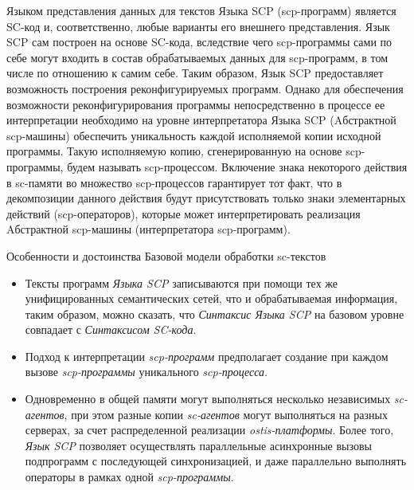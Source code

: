\begin{frame}{}
\vspace{30pt}
Языком представления данных для текстов Языка SCP (scp-программ) является SC-код и, соответственно, любые варианты его внешнего представления. Язык SCP сам построен на основе SC-кода, вследствие чего scp-программы сами по себе могут входить в состав обрабатываемых данных для scp-программ, в том числе по отношению к самим себе. Таким образом, Язык SCP предоставляет возможность построения реконфигурируемых программ. Однако для обеспечения возможности реконфигурирования программы непосредственно в процессе ее интерпретации необходимо на уровне интерпретатора Языка SCP (Aбстрактной scp-машины) обеспечить уникальность каждой исполняемой копии исходной программы. Такую исполняемую копию, сгенерированную на основе scp-программы, будем называть scp-процессом. Включение знака некоторого действия в sc-памяти во множество scp-процессов гарантирует тот факт, что в декомпозиции данного действия будут присутствовать только знаки элементарных действий (scp-операторов), которые может интерпретировать реализация Aбстрактной scp-машины (интерпретатора scp-программ).
\end{frame}

\begin{frame}{Особенности и достоинства Базовой модели обработки sc-текстов}
\topline
\vspace{30pt}
 \\

\begin{itemize}
    \item Тексты программ \textit{Языка SCP} записываются при помощи тех же унифицированных семантических сетей, что и обрабатываемая информация, таким образом, можно сказать, что \textit{Синтаксис Языка SCP} на базовом уровне совпадает с \textit{Синтаксисом SC-кода}.
    \item Подход к интерпретации \textit{scp-программ} предполагает создание при каждом вызове \textit{scp-программы} уникального \textit{scp-процесса}.
    \item Одновременно в общей памяти могут выполняться несколько независимых \textit{sc-агентов}, при этом разные копии \textit{sc-агентов} могут выполняться на разных серверах, за счет распределенной реализации \textit{ostis-платформы}. Более того, \textit{Язык SCP} позволяет осуществлять параллельные асинхронные вызовы подпрограмм с последующей синхронизацией, и даже параллельно	выполнять операторы в рамках одной \textit{scp-программы}.
    \end{itemize}
\end{frame}

